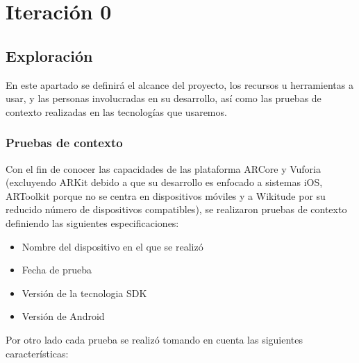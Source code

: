 \section{Iteración 0}
\subsection{Exploración}
En este apartado se definirá el alcance del proyecto, los recursos u herramientas a usar, y las personas involucradas en su desarrollo, así como las pruebas de contexto realizadas en las tecnologías que usaremos.


\subsubsection{Pruebas de contexto}
Con el fin de conocer las capacidades de las plataforma ARCore y Vuforia (excluyendo ARKit debido a que su desarrollo es enfocado a sistemas iOS, ARToolkit porque no se centra en dispositivos móviles y a Wikitude por su reducido número de dispositivos compatibles), se realizaron pruebas de contexto definiendo las siguientes especificaciones:
\begin{itemize}
	\item Nombre del dispositivo en el que se realizó
	\item Fecha de prueba
	\item Versión de la tecnologia SDK
	\item Versión de Android
\end{itemize}
Por otro lado cada prueba se realizó tomando en cuenta las siguientes características:
